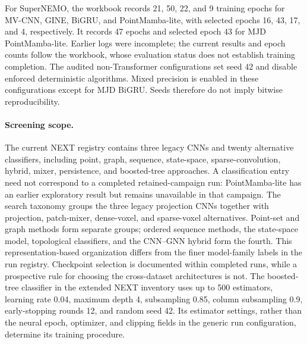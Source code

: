 For SuperNEMO, the workbook records 21, 50, 22, and 9 training epochs for MV-CNN, GINE, BiGRU, and PointMamba-lite, with selected epochs 16, 43, 17, and 4, respectively. It records 47 epochs and selected epoch 43 for MJD PointMamba-lite. Earlier logs were incomplete; the current results and epoch counts follow the workbook, whose evaluation status does not establish training completion. The audited non-Transformer configurations set seed 42 and disable enforced deterministic algorithms. Mixed precision is enabled in these configurations except for MJD BiGRU. Seeds therefore do not imply bitwise reproducibility.

\paragraph{Screening scope.}
The current NEXT registry contains three legacy CNNs and twenty alternative classifiers, including point, graph, sequence, state-space, sparse-convolution, hybrid, mixer, persistence, and boosted-tree approaches. A classification entry need not correspond to a completed retained-campaign run: PointMamba-lite has an earlier exploratory result but remains unavailable in that campaign. The search taxonomy groups the three legacy projection CNNs together with projection, patch-mixer, dense-voxel, and sparse-voxel alternatives. Point-set and graph methods form separate groups; ordered sequence methods, the state-space model, topological classifiers, and the CNN--GNN hybrid form the fourth. This representation-based organization differs from the finer model-family labels in the run registry. Checkpoint selection is documented within completed runs, while a prospective rule for choosing the cross-dataset architectures is not. The boosted-tree classifier in the extended NEXT inventory uses up to 500 estimators, learning rate 0.04, maximum depth 4, subsampling 0.85, column subsampling 0.9, early-stopping rounds 12, and random seed 42. Its estimator settings, rather than the neural epoch, optimizer, and clipping fields in the generic run configuration, determine its training procedure.

